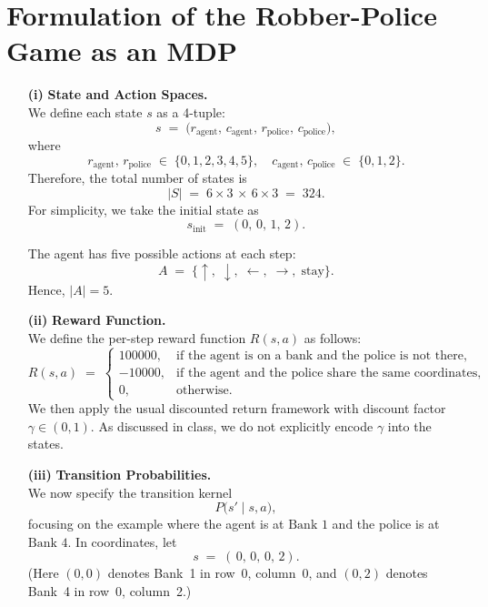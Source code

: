 \section*{Formulation of the Robber-Police Game as an MDP}

\begin{enumerate}

  \item[\textbf{(i)}]
    \textbf{State and Action Spaces.} \\[6pt]
    We define each state \(s\) as a 4-tuple:
    \[
      s \;=\; \bigl(r_{\text{agent}},\,c_{\text{agent}},\,r_{\text{police}},\,c_{\text{police}}\bigr),
    \]
    where
    \[
      r_{\text{agent}},\,r_{\text{police}} \;\in\;\{0,1,2,3,4,5\},
      \quad
      c_{\text{agent}},\,c_{\text{police}} \;\in\;\{0,1,2\}.
    \]
    Therefore, the total number of states is
    \[
      |S| \;=\; 6 \times 3 \,\times\, 6 \times 3 \;=\; 324.
    \]
    For simplicity, we take the initial state as
    \[
      s_{\text{init}} \;=\; (0,\,0,\,1,\,2).
    \]

    The agent has five possible actions at each step:
    \[
      A \;=\; \{\uparrow,\;\downarrow,\;\leftarrow,\;\rightarrow,\;\text{stay}\}.
    \]
    Hence, \(\lvert A \rvert = 5\).

  \item[\textbf{(ii)}]
    \textbf{Reward Function.} \\[6pt]
    We define the per-step reward function \(R(s,a)\) as follows:
    \[
      R(s, a) \;=\;
      \begin{cases}
        100000, & \text{if the agent is on a bank and the police is not there,} \\[3pt]
        -10000, & \text{if the agent and the police share the same coordinates,} \\[3pt]
        0, & \text{otherwise.}
      \end{cases}
    \]
    We then apply the usual discounted return framework with discount factor
    \(\gamma \in (0,1)\).  As discussed in class, we do not explicitly encode \(\gamma\) into the states.

  \item[\textbf{(iii)}]
    \textbf{Transition Probabilities.} \\[6pt]
    We now specify the transition kernel
    \[
      P\bigl(s' \mid s, a\bigr),
    \]
    focusing on the example where the agent is at \(\text{Bank 1}\) and the police is at \(\text{Bank 4}\).  In coordinates, let
    \[
      s \;=\; (\,0,\,0,\,0,\,2).
    \]
    (Here \((0,0)\) denotes Bank~1 in row~0, column~0, and \((0,2)\) denotes Bank~4 in row~0, column~2.)


\end{enumerate}
